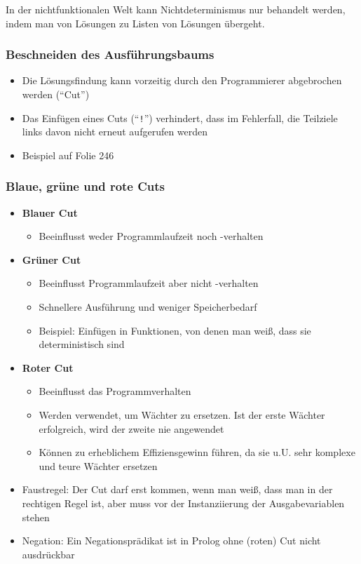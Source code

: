 In der nichtfunktionalen Welt kann Nichtdeterminismus nur behandelt werden, indem man von Lösungen zu Listen von Lösungen übergeht.

\subsubsection{Beschneiden des Ausführungsbaums}
\begin{itemize}
	\item Die Lösungsfindung kann vorzeitig durch den Programmierer abgebrochen werden ("`Cut"')
	\item Das Einfügen eines Cuts ("`\texttt{!}"') verhindert, dass im Fehlerfall, die Teilziele links davon nicht erneut aufgerufen werden
	\item Beispiel auf Folie 246
\end{itemize}

\subsubsection{Blaue, grüne und rote Cuts}
\begin{itemize}
	\item \textbf{Blauer Cut}
	\begin{itemize}
		\item Beeinflusst weder Programmlaufzeit noch -verhalten
	\end{itemize}
	\item \textbf{Grüner Cut}
	\begin{itemize}
		\item Beeinflusst Programmlaufzeit aber nicht -verhalten
		\item Schnellere Ausführung und weniger Speicherbedarf
		\item Beispiel: Einfügen in Funktionen, von denen man weiß, dass sie deterministisch sind
	\end{itemize}
	\item \textbf{Roter Cut}
	\begin{itemize}
		\item Beeinflusst das Programmverhalten
		\item Werden verwendet, um Wächter zu ersetzen. Ist der erste Wächter erfolgreich, wird der zweite nie angewendet
		\item Können zu erheblichem Effiziensgewinn führen, da sie u.U. sehr komplexe und teure Wächter ersetzen
	\end{itemize}
	\item Faustregel: Der Cut darf erst kommen, wenn man weiß, dass man in der rechtigen Regel ist, aber muss vor der Instanziierung der Ausgabevariablen stehen
	\item Negation: Ein Negationsprädikat ist in Prolog ohne (roten) Cut nicht ausdrückbar
\end{itemize}


